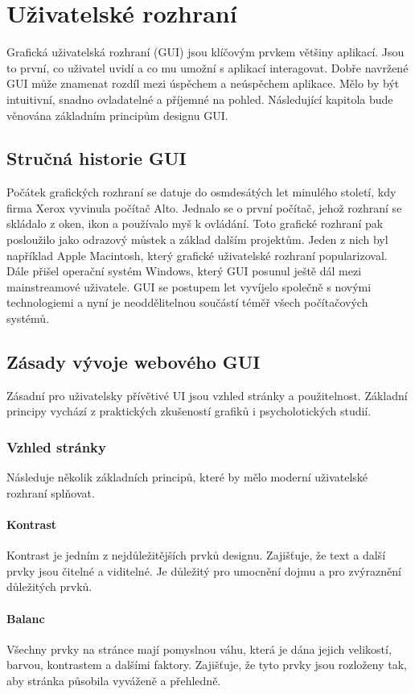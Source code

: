 \chapter{Uživatelské rozhraní}
Grafická uživatelská rozhraní (GUI) jsou klíčovým prvkem většiny aplikací. Jsou to první, co uživatel uvidí a co mu umožní s aplikací interagovat. Dobře navržené GUI může znamenat rozdíl mezi úspěchem a neúspěchem aplikace. Mělo by být intuitivní, snadno ovladatelné a příjemné na pohled. Následující kapitola bude věnována základním principům designu GUI.

\section{Stručná historie GUI}
Počátek grafických rozhraní se datuje do osmdesátých let minulého století, kdy firma Xerox vyvinula počítač Alto. Jednalo se o první počítač, jehož rozhraní se skládalo z oken, ikon a používalo myš k ovládání. Toto grafické rozhraní pak posloužilo jako odrazový můstek a základ dalším projektům. Jeden z nich byl například Apple Macintosh, který grafické uživatelské rozhraní popularizoval. Dále přišel operační systém Windows, který GUI posunul ještě dál mezi mainstreamové uživatele. GUI se postupem let vyvíjelo společně s novými technologiemi a nyní je neoddělitelnou součástí téměř všech počítačových systémů.

\section{Zásady vývoje webového GUI}
Zásadní pro uživatelsky přívětivé UI jsou vzhled stránky a použitelnost. Základní principy vychází z praktických zkušeností grafiků i psycholotických studií.

\subsection{Vzhled stránky}
Následuje několik základních principů, které by mělo moderní uživatelské rozhraní splňovat.\cite{principles_of_design}

\subsubsection*{Kontrast}
Kontrast je jedním z nejdůležitějších prvků designu. Zajišťuje, že text a další prvky jsou čitelné a viditelné. Je důležitý pro umocnění dojmu a pro zvýraznění důležitých prvků.

\subsubsection*{Balanc}
Všechny prvky na stránce mají pomyslnou váhu, která je dána jejich velikostí, barvou, kontrastem a dalšími faktory. Zajišťuje, že tyto prvky jsou rozloženy tak, aby stránka působila vyváženě a přehledně.

